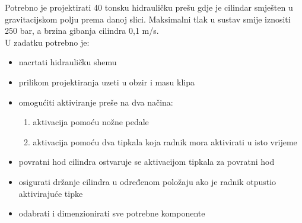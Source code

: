 \documentclass[zadatak]{FSBtex}
\begin{document}
\begin{SeminarAssignment}[]
Potrebno je projektirati 40 tonsku hidrauličku prešu gdje je cilindar smješten u gravitacijskom polju prema danoj slici. Maksimalni tlak u sustav smije iznositi 250 bar, a brzina gibanja cilindra 0,1 m/s.\\

\noindent U zadatku potrebno je:
\begin{itemize}
\setlength\itemsep{-.25em}
\item nacrtati hidrauličku shemu

\item prilikom projektiranja uzeti u obzir i masu klipa

\item omogućiti aktiviranje preše na dva načina:
\begin{enumerate}
\item aktivacija pomoću nožne pedale
\item aktivacija pomoću dva tipkala koja radnik mora aktivirati u isto vrijeme
\end{enumerate}

\item povratni hod cilindra ostvaruje se aktivacijom tipkala za povratni hod

\item osigurati držanje cilindra u određenom položaju ako je radnik otpustio aktivirajuće tipke
\item odabrati i dimenzionirati sve potrebne komponente
\end{itemize}

\end{SeminarAssignment}
\end{document}
